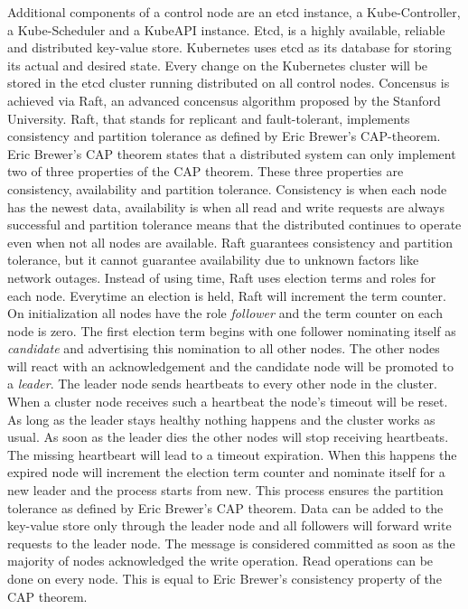 \documentclass[titlepage]{report}
\begin{document}
Additional components of a control node are an etcd\cite{etcd} instance, a Kube-Controller, a Kube-Scheduler and a KubeAPI instance. Etcd, is a highly available, reliable and distributed key-value store. Kubernetes uses etcd as its database for storing its actual 
and desired state. Every change on the Kubernetes cluster will be stored in the etcd cluster running distributed on all control nodes. Concensus is achieved via Raft, an advanced concensus algorithm proposed
by the Stanford University\cite{ongaro2013search}\cite{ongaro2014search}. Raft, that stands for replicant and fault-tolerant, implements consistency and partition tolerance as defined by Eric Brewer's CAP-theorem\cite{brewer2017spanner}.
Eric Brewer's CAP theorem states that a distributed system can only implement two of three properties of the CAP theorem. These three properties are consistency, availability and partition tolerance. Consistency is when each node
has the newest data, availability is when all read and write requests are always successful and partition tolerance means that the distributed continues to operate even when not all nodes are available\cite{bijlsma2020distributed}.
Raft guarantees consistency and partition tolerance, but it cannot guarantee availability due to unknown factors like network outages.  Instead of using time, Raft uses election terms and roles for each node. Everytime an election is held,
Raft will increment the term counter. On initialization all nodes have the role \emph{follower} and the term counter on each node is zero. The first election term begins with one follower nominating itself as \emph{candidate} and
advertising this nomination to all other nodes. The other nodes will react with an acknowledgement and the candidate node will be promoted to a \emph{leader}. The leader node sends heartbeats to every other node in the cluster.
When a cluster node receives such a heartbeat the node's timeout will be reset. As long as the leader stays healthy nothing happens and the cluster works as usual. As soon as the leader dies the other nodes will stop
receiving heartbeats. The missing heartbeart will lead to a timeout expiration. When this happens the expired node will increment the election term counter and nominate itself for a new leader and the process starts from new.
This process ensures the partition tolerance as defined by Eric Brewer's CAP theorem. Data can be added to the key-value store only through the leader node and all followers will forward write requests to the leader node. 
The message is considered committed as soon as the majority of nodes acknowledged the write operation. Read operations can be done on every node. This is equal to Eric Brewer's consistency property of the CAP theorem.
\end{document}
